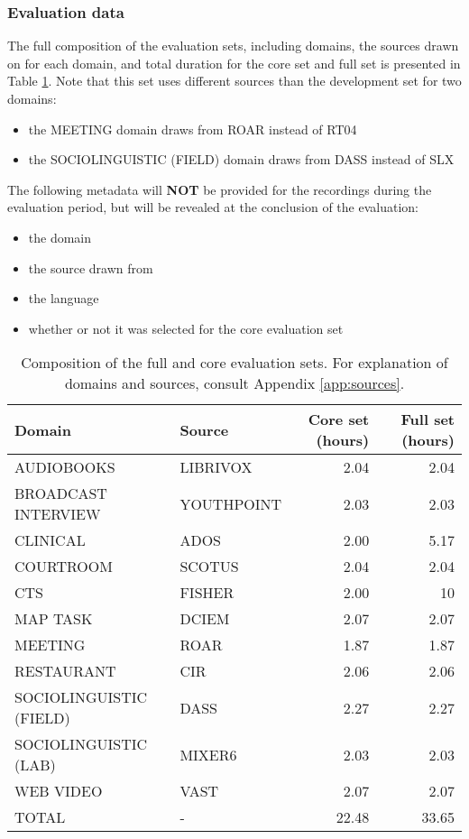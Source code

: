 \documentclass{article}
\begin{document}
\subsubsection{Evaluation data}
The full composition of the evaluation sets, including domains, the sources drawn on for each domain, and total duration for the core set and full set is presented in Table \ref{tab:single_chan_eval_set}. Note that this set uses different sources than the development set for two domains:
    \begin{itemize}
        \item the MEETING domain draws from ROAR instead of RT04
        \item the SOCIOLINGUISTIC (FIELD) domain draws from DASS instead of SLX
    \end{itemize}
The following metadata will {\bf NOT} be provided for the recordings during the evaluation period, but will be revealed at the conclusion of the evaluation:
    \begin{itemize}
        \item the domain
        \item the source drawn from
        \item the language
        \item whether or not it was selected for the core evaluation set
    \end{itemize}


\begin{table}[H]
    \centering
        \begin{tabular}{llrr}
        \hline
         {\bf Domain}         & {\bf Source} &  {\bf Core set (hours)} &   {\bf Full set (hours)} \\
        \hline
         AUDIOBOOKS           & LIBRIVOX   &  2.04 &  2.04 \\
         BROADCAST INTERVIEW  & YOUTHPOINT &  2.03 &  2.03\\
         CLINICAL             & ADOS       &  2.00 &  5.17 \\
         COURTROOM            & SCOTUS     &  2.04 &  2.04 \\
         CTS                 & FISHER     &   2.00   &  10 \\
         MAP TASK             & DCIEM      &  2.07 &  2.07 \\
         MEETING              & ROAR       &  1.87 &  1.87 \\
        RESTAURANT            & CIR        &  2.06  &  2.06 \\
         SOCIOLINGUISTIC (FIELD)         & DASS       &  2.27 &  2.27 \\
         SOCIOLINGUISTIC (LAB)           & MIXER6     &  2.03 &  2.03\\
         WEB VIDEO            & VAST       &  2.07 &  2.07 \\
         \hline
         TOTAL                & -          & 22.48 &      33.65 \\
        \hline
        \end{tabular}
    \caption{Composition of the full and core evaluation sets. For explanation of domains and sources, consult Appendix \ref{app:sources}.}
    \label{tab:single_chan_eval_set}
\end{table}
\end{document}
